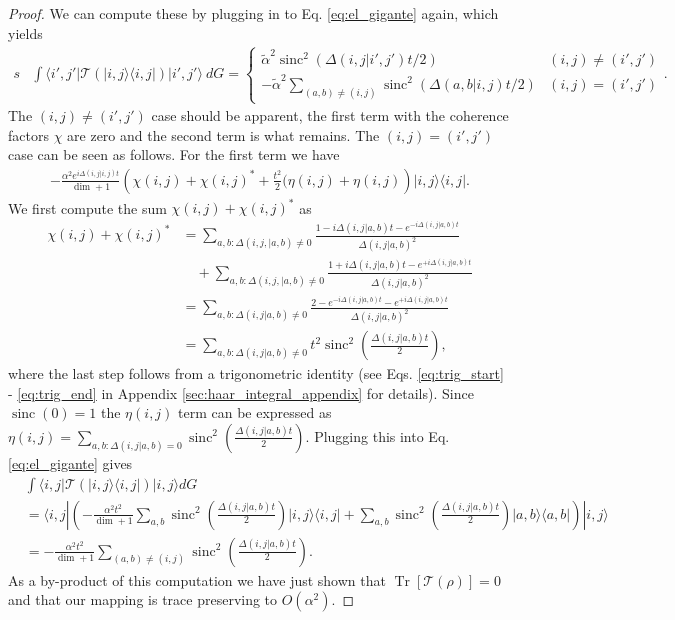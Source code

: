 \documentclass[
 amsmath,amssymb,
 aps,
onecolumn, 
nofootinbib]{revtex4-2}
\newcommand{\ket}[1]{|#1\rangle}
\newcommand{\bra}[1]{\langle #1|}
\newcommand{\ketbra}[2]{| #1\rangle\! \langle #2|}
\newcommand{\brackets}[1]{\left[ #1 \right]}
\newcommand{\bigo}[1]{O\left(#1\right)}
\DeclareMathOperator{\Tr}{Tr}
\newcommand{\trace}[1]{\Tr \brackets{ #1 }}
\DeclareMathOperator{\sinc}{sinc}
\begin{document}
\begin{proof}
We can compute these by plugging in to Eq. \eqref{eq:el_gigante} again, which yields
\begin{align}s
&\int \bra{i', j'} \mathcal{T} \left( \ketbra{i, j}{i, j} \right) \ket{i', j'} ~dG = \begin{cases}        
\widetilde{\alpha}^2 \sinc^2(\Delta(i,j | i', j') t /2) & (i, j) \neq (i', j') \\
            - \widetilde{\alpha}^2 \sum_{(a,b) \neq (i, j)} \sinc^2(\Delta(a,b|i,j) t / 2) & (i,j) = (i', j')
        \end{cases}. \label{eq:system_environment_transitions}
    \end{align}
    The $(i, j) \neq (i', j')$ case should be apparent, the first term with the coherence factors $\chi$ are zero and the second term is what remains. The $(i,j) = (i', j')$ case can be seen as follows. For the first term we have
    \begin{align}
        - \frac{\alpha^2 e^{i \Delta(i,j| i,j) t}}{\dim + 1}\left(\chi(i,j) + \chi(i,j)^* + \frac{t^2}{2}(\eta(i,j) + \eta(i,j) \right) \ketbra{i,j}{i,j}.
    \end{align}
    We first compute the sum $\chi(i,j) + \chi(i,j)^*$ as
    \begin{align}
        \chi(i,j) + \chi(i,j)^* &= \sum_{a,b: \Delta(i,j,|a,b) \neq 0} \frac{1 - i \Delta(i,j|a,b)t - e^{-i \Delta(i,j|a,b) t}}{\Delta(i,j|a,b)^2} \nonumber\\
&\quad+ \sum_{a,b: \Delta(i,j,|a,b) \neq 0} \frac{1 + i \Delta(i,j|a,b)t - e^{+i \Delta(i,j|a,b) t}}{\Delta(i,j|a,b)^2} \\
    &= \sum_{a,b: \Delta(i,j| a,b) \neq 0} \frac{2 - e^{-i \Delta(i,j| a,b) t} - e^{+i \Delta(i,j| a,b) t}}{\Delta(i,j|a,b)^2} \\
    &= \sum_{a,b: \Delta(i,j| a,b) \neq 0} t^2 \sinc^2 \left( \frac{\Delta(i,j| a,b) t}{2} \right),
    \end{align}
    where the last step follows from a trigonometric identity (see Eqs. \eqref{eq:trig_start} - \eqref{eq:trig_end} in Appendix \ref{sec:haar_integral_appendix} for details). Since $\sinc(0) = 1$ the $\eta(i,j)$ term can be expressed as $\eta(i,j) = \sum_{a,b : \Delta(i,j|a,b) = 0} \sinc^2 \left( \frac{\Delta(i,j| a,b) t}{2} \right)$. Plugging this into Eq. \eqref{eq:el_gigante} gives
    \begin{align}
        &\int \bra{i,j} \mathcal{T} (\ketbra{i,j}{i,j}) \ket{i,j} dG \\
        &= \bra{i,j} \left(-\frac{\alpha^2 t^2}{\dim + 1} \sum_{a,b} \sinc^2 \left( \frac{\Delta(i,j| a,b) t}{2} \right) \ketbra{i,j}{i,j} + \sum_{a,b} \sinc^2\left( \frac{\Delta(i,j | a,b)t}{2} \right) \ketbra{a,b}{a,b} \right) \ket{i,j} \\
        &= -\frac{\alpha^2 t^2}{\dim + 1} \sum_{(a,b) \neq (i,j)} \sinc^2 \left( \frac{\Delta(i,j| a,b) t}{2} \right).
    \end{align}
    As a by-product of this computation we have just shown that $\trace{\mathcal{T}(\rho)} = 0$ and that our mapping is trace preserving to $\bigo{\alpha^2}$.
\end{proof}
\end{document}
